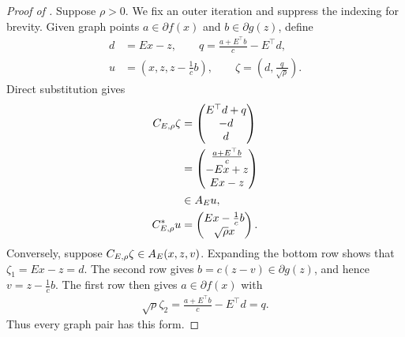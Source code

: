\documentclass[11pt]{article}
\begin{document}
\begin{proof}[Proof of ]
    Suppose $\rho>0$.
    We fix an outer iteration and suppress the indexing for brevity.
    Given graph points $a\in\partial f(x)$ and $b\in\partial g(z)$, define
    \begin{align}
        d&=Ex-z,\qquad q=\frac{a+ E^\top b}{c}- E^\top d,\\
        u&=(x,z,z-\frac{1}{c}b),\qquad \zeta=\left(d,\frac{q}{\sqrt{\rho}}\right).
    \end{align}
    Direct substitution gives
    \begin{align}
        {C}_{E,\rho}\zeta &= \begin{pmatrix}
            E^\top d+q \\
            -d\\
            d\end{pmatrix} \\
        &=\begin{pmatrix}
            \frac{a+ E^\top b}{c} \\ 
            -Ex+z \\
            Ex-z
        \end{pmatrix} \\
        &\in{A}_E u,\\
        {C}_{E,\rho}^*u &=\begin{pmatrix}Ex-\frac{1}{c}b\\\sqrt{\rho}x\end{pmatrix}.
    \end{align}
    Conversely, suppose ${C}_{E,\rho}\zeta\in{A}_E(x,z,v)$.
    Expanding the bottom row shows that  $\zeta_1=Ex-z=d$.
    The second row gives $b=c(z-v)\in\partial g(z)$, and hence $v=z-\frac{1}{c}b$.
    The first row then gives $a\in\partial f(x)$ with
    \begin{align}
        \sqrt{\rho}\zeta_2=\frac{a+ E^\top b}{c}- E^\top d=q.
    \end{align}
    Thus every graph pair has this form.


\end{proof}
\end{document}
